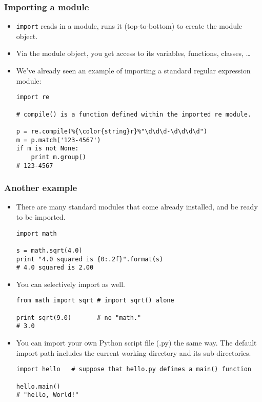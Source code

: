 \documentclass{beamer}
\begin{document}
\begin{frame}[fragile]
\frametitle{Importing a module}
\begin{itemize}
\item \lstinline{import} reads in a module, runs
      it (top-to-bottom) to create the module
      object.
\item Via the module object, you get access to its
      variables, functions, classes, \ldots
\item We've already seen an example of importing
      a standard regular expression module:
\begin{lstlisting}[escapechar=\%]
import re 

# compile() is a function defined within the imported re module.

p = re.compile(%{\color{string}r}%"\d\d\d-\d\d\d\d")
m = p.match('123-4567')
if m is not None:
    print m.group()
# 123-4567
\end{lstlisting}
\end{itemize}
\end{frame}

\begin{frame}[fragile]
\frametitle{Another example}
\begin{itemize}
\item There are many standard modules that come
      already installed, and be ready to be imported.
\begin{lstlisting}[escapechar=\%]
import math

s = math.sqrt(4.0)
print "4.0 squared is {0:.2f}".format(s)
# 4.0 squared is 2.00
\end{lstlisting}
\item You can selectively import as well.
\begin{lstlisting}
from math import sqrt # import sqrt() alone

print sqrt(9.0)       # no "math."
# 3.0
\end{lstlisting}
\item You can import your own Python script file (.py)
      the same way. The default import path includes
      the current working directory and its sub-directories.
\begin{lstlisting}
import hello   # suppose that hello.py defines a main() function

hello.main()
# "hello, World!"
\end{lstlisting}
\end{itemize}
\end{frame}
\end{document}
